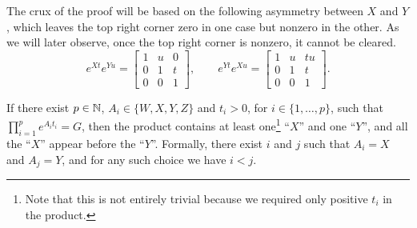 The crux of the proof will be based on the following asymmetry between $X$ and $Y$,
which leaves the top right corner zero in one case but nonzero in the other. As we will later
observe, once the top right corner is nonzero, it cannot be cleared.
\[
e^{Xt}e^{Yu}=\begin{bmatrix}1&u&0\\0&1&t\\0&0&1\end{bmatrix},\qquad
e^{Yt}e^{Xu}=\begin{bmatrix}1&u&tu\\0&1&t\\0&0&1\end{bmatrix}.
\]

\begin{proposition}\label{prop:eq_has_forced_order}
If there exist $p\in\mathbb{N}$, $A_{i}\in\lbrace W,X,Y,Z\rbrace$ and $t_{i}>0$, for $i\in\lbrace 1,\ldots,p\rbrace$,
such that $\prod_{i=1}^{p} e^{A_{i}t_{i}}=G$, then the product contains at least one\footnote{Note
that this is not entirely trivial because we required only positive $t_{i}$ in the product.}
``$X$'' and one ``$Y$'', and all the ``$X$'' appear before the ``$Y$''.
Formally, there exist $i$ and $j$ such that $A_{i}=X$ and $A_{j}=Y$, and for
any such choice we have $i<j$.
\end{proposition}

